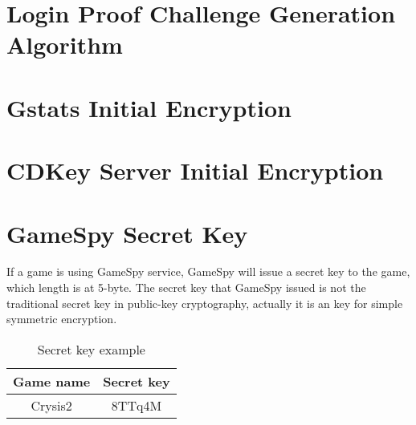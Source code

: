 \documentclass[oneside,titlepage,a4paper]{Definition/retrospy} %
\begin{document}
\begin{appendix}
\chapter{Login Proof Challenge Generation Algorithm}\label{Login Proof Challenge Gerneration Algorithm}
\chapter{Gstats Initial Encryption}
\chapter{CDKey Server Initial Encryption}
\chapter{GameSpy Secret Key}\label{GameSpy Secret Key}
If a game is using GameSpy service, GameSpy will issue  a secret key to the game, which length is at 5-byte. The secret key that GameSpy issued is not the traditional secret key in public-key cryptography, actually it is an key for simple symmetric encryption.
\begin{table}[H]
	\centering
	\begin{tabular}{|c|c|}
		\hline
		\textbf{Game name}&\textbf{Secret key}\\\hline
		Crysis2&8TTq4M\\\hline
  \end{tabular}
\caption{Secret key example}
\label{Secret key example}
\end{table}
\end{appendix}
\end{document}
